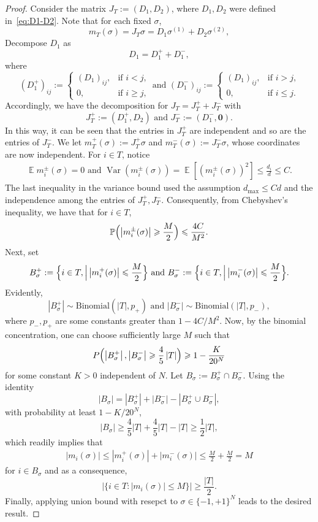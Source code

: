 \documentclass[letterpaper,11pt,reqno]{amsart}
\renewcommand{\le}{\leqslant}
\renewcommand{\ge}{\geqslant}
\renewcommand{\geq}{\geqslant}
\newcommand{\abs}[1]{\left\vert#1\right\vert}
\newcommand{\mv}[1]{\boldsymbol{#1}}\newcommand{\mvinfty}{\boldsymbol{\infty}}\newcommand{\mvzero}{\boldsymbol{0}}
\newcommand{\mvgs}{{\sigma}}
\newcommand{\bP}{\mathbb{P}}\newcommand{\bQ}{\mathbb{Q}}\newcommand{\bR}{\mathbb{R}}
\DeclareMathOperator{\E}{\mathds{E}}
\DeclareMathOperator{\var}{Var}
\begin{document}
\begin{proof}
Consider the matrix $J_T:=(D_1, D_2)$, where $D_1,D_2$ were defined in~\eqref{eq:D1-D2}. Note that for each fixed $\mvgs$,
\[
m_T(\mvgs) = J_T \mvgs = D_1\mvgs^{(1)} + D_2\mvgs^{(2)},
\]
Decompose $D_1$ as 
\[
D_1 = D_1^+ + D_1^-, 
\]
where 
\[
(D_{1}^+)_{ij} := \begin{cases}
    (D_1)_{ij}, & \text{if $i<j$,}\\
     0 , & \text{if $i\ge j$,}
     \end{cases}\,\,\text{and}\,\,(D_{1}^-)_{ij} := \begin{cases}
    (D_1)_{ij}, & \text{if $i>j$,}\\
     0 , & \text{if $i\le j$.}
     \end{cases}
\]
Accordingly, we have the decomposition for $J_T= J_T^+ + J_T^-$ with 
\[
J_T^+:= (D_1^+, D_2)\,\,\text{and}\,\, J_T^-:= (D_1^-, \mv0).
\]
In this way, it can be seen that the entries in $J_T^+$ are independent and so are the entries of $J_T^-$. We let $m_T^+(\mvgs):= J_T^+\mvgs$ and $m_T^-(\mvgs):=J_T^- \mvgs$, whose coordinates are now independent.  For $i\in T$, notice 
\begin{align*}
    \E m_i^{\pm}(\mvgs) = 0\,\,\text{and}\,\,\var(m_i^\pm(\mvgs)) = \E[(m_i^{\pm}(\mvgs))^2] \le  \frac{d_i}{d} \le C.
\end{align*}
The last inequality in the variance bound used the assumption $d_{\max} \le C d$ and the independence among the entries of $J_T^+, J_T^-$. Consequently, from Chebyshev's inequality, we have that for $i \in T$,
\[
\bP\Bigl(\abs{m_i^{\pm}(\mvgs)} \ge \frac{M}{2}\Bigr) \le \frac{4C}{M^2}.
\]
Next, set 
\begin{align*}
    B^{+}_{\mvgs}:= \Bigl\{i\in T,\Big | \abs{m_i^{+}(\mvgs)}\le \frac{M}{2} \Bigr\}\,\,\text{and}\,\, B^{-}_{\mvgs}:= \Bigl\{i\in T,\Big | \abs{m_i^{-}(\mvgs)}\le \frac{M}{2} \Bigr\}.
\end{align*}
Evidently,
\[
\abs{B_{\mvgs}^{+}} \sim \mathrm{Binomial}\left(\abs{T}, p_+ \right)\,\,\text{and}\,\,\abs{B_{\mvgs}^{-}} \sim \mathrm{Binomial}\left(\abs{T},p_-\right),
\]
where $p_-, p_+$ are some constants greater than $1- {4C}/{M^2}$. 
Now, by the binomial concentration,  one can choose sufficiently large $M$ such that 
\[
P\Bigl(\abs{B_{\mvgs}^+}, \abs{B_{\mvgs}^-} \ge \frac45 \abs{T}\Bigr) \ge  1- \frac{K}{20^N}
\]
for some constant $K>0$ independent of $N.$
Let $B_{\mvgs}:=B_{\mvgs}^+ \cap B_{\mvgs}^-$. Using the identity $$|B_{\mvgs}|=|B_{\mvgs}^+|+|B_{\mvgs}^-|-|B_{\mvgs}^+\cup B_{\mvgs}^-|,$$
with probability at least $1-K/  20^{N}$,
\[
\abs{B_{\mvgs}} \ge \frac45 \abs{T} + \frac45 \abs{T} - \abs{T} \ge \frac12 \abs{T},
\]
which readily implies that
\begin{align*}
    \abs{m_i(\mvgs)} \le \abs{m_i^+(\mvgs)} + \abs{m_i^-(\mvgs)} \le \frac{M}{2} + \frac{M}{2} = M
\end{align*}
for $i\in B_{\mvgs}$ and as a consequence,  \[ |\{ i \in T : |m_i(\mvgs)| \le M \}| \geq \frac{|T|}{2}. \]
Finally, applying union bound with resepct to $\mvgs \in \{-1,+1\}^N$ leads to the desired result.
\end{proof}
\end{document}
